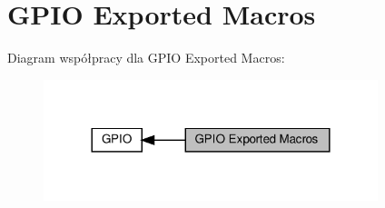 \hypertarget{group___g_p_i_o___exported___macros}{}\section{G\+P\+IO Exported Macros}
\label{group___g_p_i_o___exported___macros}
Diagram współpracy dla G\+P\+IO Exported Macros\+:\nopagebreak
\begin{figure}[H]
\begin{center}
\leavevmode
\includegraphics[width=276pt]{group___g_p_i_o___exported___macros}
\end{center}
\end{figure}

